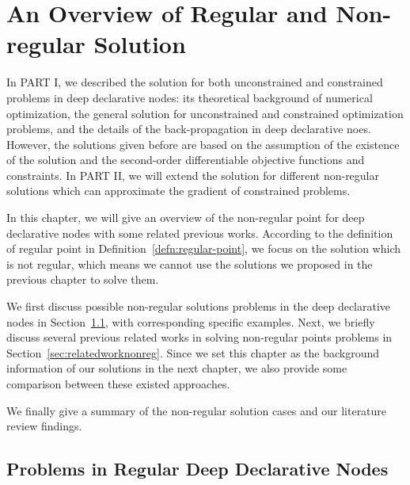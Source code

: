 \chapter{An Overview of Regular and Non-regular Solution}
\label{cha:overviewpart2}
In PART I, we described the solution for both unconstrained and constrained problems in deep declarative nodes: its theoretical background of numerical optimization, the general solution for unconstrained and constrained optimization problems, and the details of the back-propagation in deep declarative noes. However, the solutions given before are based on the assumption of the existence of the solution and the second-order differentiable objective functions and constraints. In PART II, we will extend the solution for different non-regular solutions which can approximate the gradient of constrained problems. 
\par In this chapter, we will give an overview of the non-regular point for deep declarative nodes with some related previous works. According to the definition of regular point in Definition~\ref{defn:regular-point}, we focus on the solution which is not regular, which means we cannot use the solutions we proposed in the previous chapter to solve them. 
\par We first discuss possible non-regular solutions problems in the deep declarative nodes in Section~\ref{sec:problems-in-non-regular}, with corresponding specific examples. Next, we briefly discuss several previous related works in solving non-regular points problems in Section~\ref{sec:relatedworknonreg}. Since we set this chapter as the background information of our solutions in the next chapter, we also provide some comparison between these existed approaches. 
\par We finally give a summary of the non-regular solution cases and our literature review findings. 


\section{Problems in Regular Deep Declarative Nodes}
\label{sec:problems-in-non-regular}

